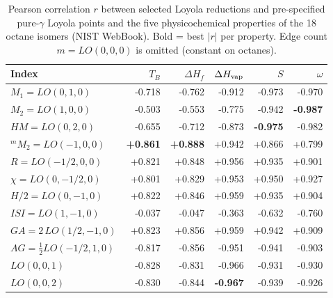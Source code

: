 \begin{table}[H]
\centering
\caption{Pearson correlation $r$ between selected Loyola reductions and pre-specified pure-$\gamma$ Loyola points and the five physicochemical properties of the 18 octane isomers (NIST WebBook). Bold = best $|r|$ per property. Edge count $m=LO(0,0,0)$ is omitted (constant on octanes).}
\label{tab:lo_octane}
\small
\begin{tabular}{lrrrrr}
\toprule
Index & $T_B$ & $\Delta H_f$ & $\Delta H_{\rm vap}$ & $S$ & $\omega$\\
\midrule
$M_1{=}LO(0,1,0)$ & -0.718 & -0.762 & -0.912 & -0.973 & -0.970\\
$M_2{=}LO(1,0,0)$ & -0.503 & -0.553 & -0.775 & -0.942 & \textbf{-0.987}\\
$HM{=}LO(0,2,0)$ & -0.655 & -0.712 & -0.873 & \textbf{-0.975} & -0.982\\
${}^mM_2{=}LO(-1,0,0)$ & \textbf{+0.861} & \textbf{+0.888} & +0.942 & +0.866 & +0.799\\
$R{=}LO(-1/2,0,0)$ & +0.821 & +0.848 & +0.956 & +0.935 & +0.901\\
$\chi{=}LO(0,-1/2,0)$ & +0.801 & +0.829 & +0.953 & +0.950 & +0.927\\
$H/2{=}LO(0,-1,0)$ & +0.822 & +0.846 & +0.959 & +0.935 & +0.904\\
$ISI{=}LO(1,-1,0)$ & -0.037 & -0.047 & -0.363 & -0.632 & -0.760\\
$GA{=}2\,LO(1/2,-1,0)$ & +0.823 & +0.856 & +0.959 & +0.942 & +0.909\\
$AG{=}\frac{1}{2}LO(-1/2,1,0)$ & -0.817 & -0.856 & -0.951 & -0.941 & -0.903\\
$LO(0,0,1)$ & -0.828 & -0.831 & -0.966 & -0.931 & -0.930\\
$LO(0,0,2)$ & -0.830 & -0.844 & \textbf{-0.967} & -0.939 & -0.926\\
\bottomrule
\end{tabular}
\end{table}
